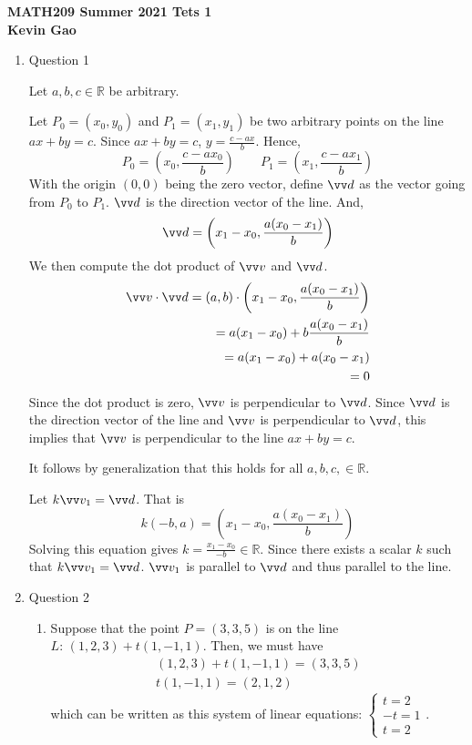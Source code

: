 \documentclass[11pt]{article}
\def\R {{\mathbb R}}
\begin{document}
\begin{center}

{\bf \Large \bf MATH209 Summer 2021 Tets 1}\\
{\bf \large Kevin Gao}
\end{center}

\begin{enumerate}
    \item Question 1
    
    Let $a,b,c\in\R$ be arbitrary.
    
    Let $P_0 = (x_0, y_0)$ and $P_1 = (x_1, y_1)$ be two arbitrary points on the line $ax+by=c$. Since $ax+by = c$, $y=\frac{c-ax}{b}$. Hence,
    $$
    P_0 = \left(x_0, \frac{c-ax_0}{b}\right) \qquad P_1 = \left(x_1, \frac{c-ax_1}{b}\right)
    $$
    With the origin $(0,0)$ being the zero vector, define $\vv d$ as the vector going from $P_0$ to $P_1$. $\vv d$ is the direction vector of the line. And,
    $$
    \vv d = \left( x_1-x_0, \frac{a(x_0-x_1)}{b} \right)
    $$
    We then compute the dot product of $\vv v$ and $\vv d$.
    \begin{align*}
        \vv v \cdot \vv d = (a,b) \cdot \left( x_1-x_0, \frac{a(x_0-x_1)}{b} \right) \\
        = a(x_1-x_0) + b\frac{a(x_0-x_1)}{b} \\
        = a(x_1-x_0) + a(x_0-x_1) \\
        = 0
    \end{align*}
    Since the dot product is zero, $\vv v$ is perpendicular to $\vv d$. Since $\vv d$ is the direction vector of the line and $\vv v$ is perpendicular to $\vv d$, this implies that $\vv v$ is perpendicular to the line $ax+by=c$.
    
    It follows by generalization that this holds for all $a,b,c,\in\R$.
    
    \hfill
    
    Let $k\vv v_1 = \vv d$. That is
    $$
    k(-b,a) = \left( x_1-x_0, \frac{a(x_0-x_1)}{b} \right)
    $$
    Solving this equation gives $\displaystyle k = \frac{x_1-x_0}{-b} \in \R$. Since there exists a scalar $k$ such that $k\vv v_1 = \vv d$. $\vv v_1$ is parallel to $\vv d$ and thus parallel to the line.
    
    \item Question 2
    
    \begin{enumerate}
        \item Suppose that the point $P=(3,3,5)$ is on the line $L:\, (1,2,3) + t(1,-1,1)$. Then, we must have
        \begin{align*}
            (1,2,3) + t(1,-1,1) = (3,3,5) \\
            t(1,-1,1) = (2,1,2)
        \end{align*}
        which can be written as this system of linear equations: 
        $
        \begin{cases}
        t = 2 \\
        -t = 1 \\
        t = 2
        \end{cases}
        $.
        

\end{enumerate}
\end{enumerate}
\end{document}
